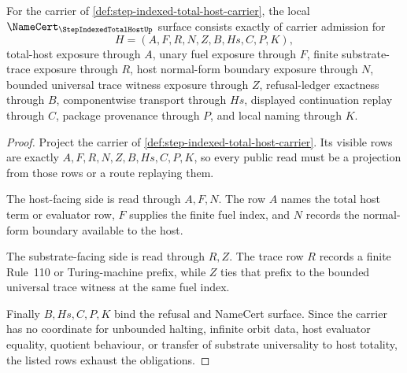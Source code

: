 \begin{theorem}
\label{thm:step-indexed-total-host-namecert-obligations}
For the carrier of \autoref{def:step-indexed-total-host-carrier}, the local $\NameCert_{\StepIndexedTotalHostUp}$ surface consists exactly of carrier admission for
$$
H=(A,F,R,N,Z,B,Hs,C,P,K),
$$
total-host exposure through $A$, unary fuel exposure through $F$, finite substrate-trace exposure through $R$, host normal-form boundary exposure through $N$, bounded universal trace witness exposure through $Z$, refusal-ledger exactness through $B$, componentwise transport through $Hs$, displayed continuation replay through $C$, package provenance through $P$, and local naming through $K$.
\end{theorem}
\begin{proof}
Project the carrier of \autoref{def:step-indexed-total-host-carrier}. Its visible rows are exactly $A,F,R,N,Z,B,Hs,C,P,K$, so every public read must be a projection from those rows or a route replaying them.

The host-facing side is read through $A,F,N$. The row $A$ names the total host term or evaluator row, $F$ supplies the finite fuel index, and $N$ records the normal-form boundary available to the host.

The substrate-facing side is read through $R,Z$. The trace row $R$ records a finite Rule~110 or Turing-machine prefix, while $Z$ ties that prefix to the bounded universal trace witness at the same fuel index.

Finally $B,Hs,C,P,K$ bind the refusal and NameCert surface. Since the carrier has no coordinate for unbounded halting, infinite orbit data, host evaluator equality, quotient behaviour, or transfer of substrate universality to host totality, the listed rows exhaust the obligations.
\end{proof}

